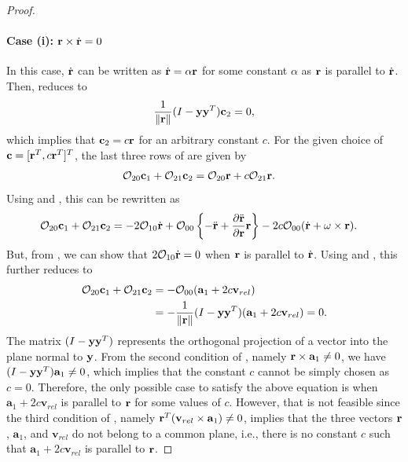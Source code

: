 \begin{proof}
\paragraph{Case (i): $\mathbf{r}\times\dot {\mathbf{r}}=0$} In this case, $\dot {\mathbf{r}}$ can be written as $\dot {\mathbf{r}} = \alpha\mathbf{r}$ for some constant $\alpha$ as $\mathbf{r}$ is parallel to $\dot{\mathbf{r}}$. Then,  reduces to 
\begin{align*}
\frac{1}{\|\mathbf{r}\|}(I-\mathbf{y}\mathbf{y}^T)\mathbf{c}_2=0,
\end{align*}
which implies that $\mathbf{c}_2= c\mathbf{r}$ for an arbitrary constant $c$. For the given choice of $\mathbf{c}=[\mathbf{r}^T,c\mathbf{r}^T]^T$, the last three rows of  are given by
\begin{align*}
\mathcal{O}_{20} \mathbf{c}_1 +\mathcal{O}_{21} \mathbf{c}_2 
& = \mathcal{O}_{20} \mathbf{r} + c\mathcal{O}_{21} \mathbf{r}.
\end{align*}
Using  and , this can be rewritten as
\begin{align*}
\mathcal{O}_{20} \mathbf{c}_1 +\mathcal{O}_{21} \mathbf{c}_2 
& =
-2\mathcal{O}_{10}\dot{\mathbf{r}} +\mathcal{O}_{00}\left\{ -\ddot {\mathbf{r}} +\frac{\partial \ddot{\mathbf{r}}}{\partial \mathbf{r}}\mathbf{r} \right\}
-2c\mathcal{O}_{00} (\dot{\mathbf{r}}+\omega\times\mathbf{r}).
\end{align*}
But, from , we can show that $2\mathcal{O}_{10}\dot{\mathbf{r}}=0$ when $\mathbf{r}$ is parallel to $\dot {\mathbf{r}}$. Using  and , this further reduces to
\begin{align}
\mathcal{O}_{20} \mathbf{c}_1 +\mathcal{O}_{21} \mathbf{c}_2 
& =
-\mathcal{O}_{00}(\mathbf{a}_1 +2c \mathbf{v}_{rel})\nonumber\\
& = - \frac{1}{\|\mathbf{r}\|}(I-\mathbf{y}\mathbf{y}^T)(\mathbf{a}_1 +2c \mathbf{v}_{rel})=0.\label{eqn:row3i}
\end{align}
The matrix $(I-\mathbf{y}\mathbf{y}^T)$ represents the orthogonal projection of a vector into the plane normal to $\mathbf{y}$. From the second condition of , namely $\mathbf{r}\times\mathbf{a}_1\neq 0$, we have $(I-\mathbf{y}\mathbf{y}^T)\mathbf{a}_1\neq 0$, which implies that the constant $c$ cannot be simply chosen as $c=0$. Therefore, the only possible case to satisfy the above equation is when $\mathbf{a}_1 +2c \mathbf{v}_{rel}$ is parallel to $\mathbf{r}$ for some values of $c$. However, that is not feasible since the third condition of , namely $\mathbf{r}^T(\mathbf{v}_{rel}\times\mathbf{a}_1)\neq0$, implies that the three vectors $\mathbf{r}$, $\mathbf{a}_1$, and $\mathbf{v}_{rel}$ do not belong to a common plane, i.e., there is no constant $c$ such that $\mathbf{a}_1 +2c \mathbf{v}_{rel}$ is parallel to $\mathbf{r}$.


\end{proof}
